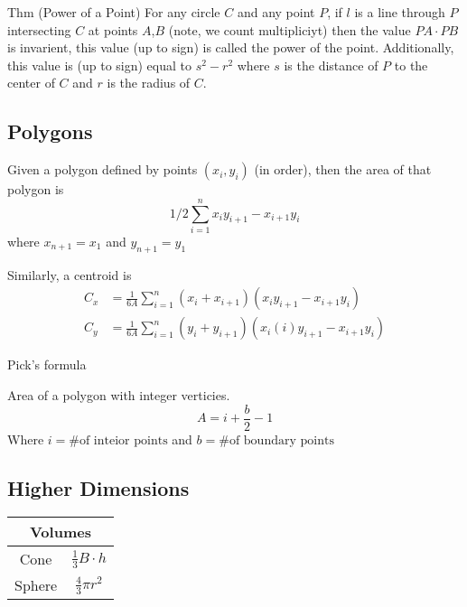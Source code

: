 


Thm (Power of a Point) For any circle $C$ and any point $P$, if $l$ is a line through $P$ intersecting $C$ at points $A$,$B$ (note, we count multipliciyt) then the value $PA \cdot PB$ is invarient, this value (up to sign) is called the power of the point. Additionally, this value is (up to sign) equal to $s^2-r^2$ where $s$ is the distance of $P$ to the center of $C$ and $r$ is the radius of $C$.



\subsection{Polygons}

Given a polygon defined by points $(x_i,y_i)$ (in order), then the area of that polygon is
\[1/2\sum_{i=1}^{n}x_iy_{i+1} - x_{i+1} y_i\]
where $x_{n+1} = x_{1}$ and $y_{n+1} = y_1$


Similarly, a centroid is
\begin{align*}
  C_x &= \frac{1}{6A} \sum_{i=1}^n (x_i + x_{i+1} )( x_i y_{i+1} - x_{i+1} y_i )\\
  C_y &= \frac{1}{6A} \sum_{i=1}^n (y_i + y_{i+1})( x_i(i)y_{i+1} - x_{i+1}y_i )
\end{align*}

Pick's formula

Area of a polygon with integer verticies.
\[A= i + \frac{b}{2} - 1\]
Where $i = \textrm{\# of inteior points}$ and $b = \textrm{\# of boundary points}$

\subsection{Higher Dimensions}

\noindent
\begin{tabular}{|c|c|}
  \hline
  \multicolumn{2}{|c|}{Volumes}\\\hline
  Cone & $\frac{1}{3}B\cdot h$\\\hline
  Sphere & $\frac{4}{3}\pi r^2$\\\hline
\end{tabular}


